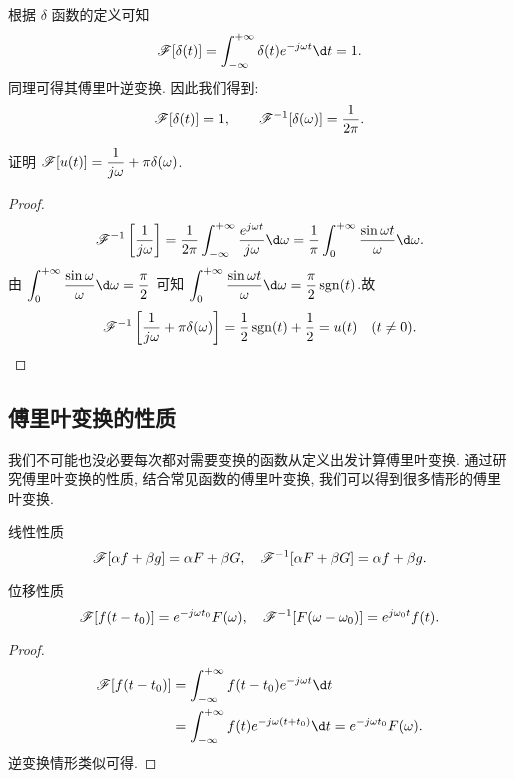 根据 $\delta$ 函数的定义可知
\[\msf[\delta(t)]=\int_{-\infty}^{+\infty}\delta(t)e^{-j\omega t}\d t=1.\]
同理可得其傅里叶逆变换.
因此我们得到:
	\[\mathscr{F}[\delta(t)]=1,\qquad
	\mathscr{F}^{-1}[\delta(\omega)]=\dfrac1{2\pi}.\]

\begin{example}
	证明 \emph{$\mathscr{F}[u(t)]=\dfrac1{j\omega}+\pi\delta(\omega)$}.
\end{example}

\begin{proof}
		\[\msf^{-1}\left[\frac1{j\omega}\right]
		=\frac1{2\pi}\int_{-\infty}^{+\infty}\frac{e^{j\omega t}}{j\omega} \d\omega
		=\frac1\pi\int_0^{+\infty}\frac{\sin\omega t}{\omega} \d\omega.\]
	{由
		$\displaystyle\int_0^{+\infty}\frac{\sin\omega}\omega \d\omega=\dfrac\pi2$
		可知
		$\displaystyle\int_0^{+\infty}\frac{\sin\omega t}\omega \d\omega=\frac\pi2\sgn(t)$.故
		\[\mathscr{F}^{-1} \left[\frac1{j\omega}+\pi\delta(\omega)\right]
		=\frac{1}{2}\operatorname{sgn}(t)+\frac{1}{2} =u(t)\quad (t\neq 0).\qedhere\]
	}
\end{proof}

\subsection{傅里叶变换的性质}

我们不可能也没必要每次都对需要变换的函数从定义出发计算傅里叶变换.
通过研究傅里叶变换的性质, 结合常见函数的傅里叶变换, 我们可以得到很多情形的傅里叶变换.

\begin{theorem}{线性性质}
	\[\mathscr{F}[\alpha f+\beta g]=\alpha F+\beta G,\quad
	\mathscr{F}^{-1}[\alpha F+\beta G]=\alpha f+\beta g.\]
\end{theorem}

\begin{theorem}{位移性质}
	\[\mathscr{F}[f(t-t_0)]=e^{-j\omega t_0}F(\omega),\quad
	\mathscr{F}^{-1}[F(\omega-\omega_0)]=e^{j\omega_0 t}f(t).\]
\end{theorem}

\begin{proof}
	\begin{align*}
		\msf[f(t-t_0)]&=\int_{-\infty}^{+\infty}f(t-t_0)e^{-j\omega t}\d t\\
		&=\int_{-\infty}^{+\infty}f(t)e^{-j\omega (t+t_0)}\d t=e^{-j\omega t_0}F(\omega).
	\end{align*}
	{逆变换情形类似可得.\qedhere}
\end{proof}


